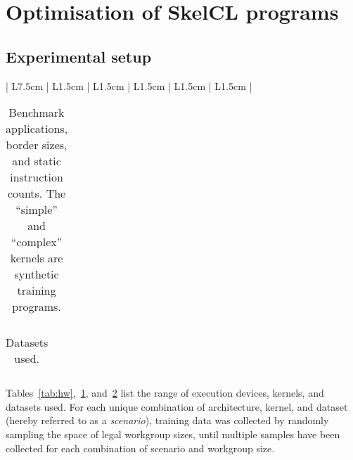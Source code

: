 %

\section{Optimisation of SkelCL programs}

\subsection{Experimental setup}

\begin{table}
\footnotesize
\centering
\begin{tabular}{| L{7.5cm} | L{1.5cm} | L{1.5cm} | L{1.5cm} | L{1.5cm} | L{1.5cm} |}
\hline

\hline
\end{tabular}
\caption{%
  Execution devices. %
}
\label{tab:hw}
\end{table}

\begin{table}
\footnotesize
\centering
\begin{tabular}{| l | l | l | l | l | l |}
\hline

\hline
\end{tabular}
\caption{%
  Benchmark applications, border sizes, and static instruction counts.
  The ``simple'' and ``complex'' kernels are synthetic training
  programs. %
}
\label{tab:kernels}
\end{table}

\begin{table}
\footnotesize
\centering
\begin{tabular}{| l | l | l | l |}
\hline

\hline
\end{tabular}
\caption{%
  Datasets used.%
}
\label{tab:datasets}
\end{table}

Tables~\ref{tab:hw},~\ref{tab:kernels}, and~\ref{tab:datasets} list
the range of execution devices, kernels, and datasets used. For each
unique combination of architecture, kernel, and dataset (hereby
referred to as a \emph{scenario}), training data was collected by
randomly sampling the space of legal workgroup sizes, until multiple
samples have been collected for each combination of scenario and
workgroup size.

